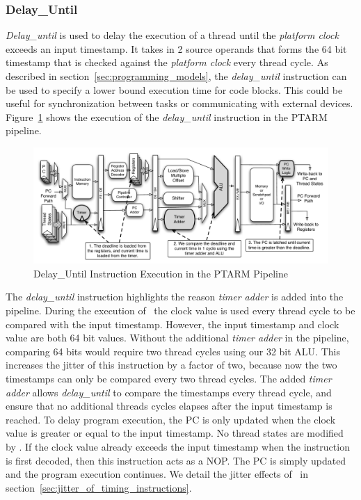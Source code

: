 \subsubsection{Delay\_Until}    
\emph{Delay\_until} is used to delay the execution of a thread until the \emph{platform clock} exceeds an input timestamp.
It takes in 2 source operands that forms the 64 bit timestamp that is checked against the \emph{platform clock} every thread cycle.
As described in section~\ref{sec:programming_models}, the \emph{delay\_until} instruction can be used to specify a lower bound execution time for code blocks.
This could be useful for synchronization between tasks or communicating with external devices.
Figure~\ref{fig:delay_until_pipeline_implementation} shows the execution of the \emph{delay\_until} instruction in the PTARM pipeline.       
\begin{figure}[h]
  \begin{center}
    \includegraphics[scale=.54]{figs/delay_until_pipeline_implementation}
  \end{center}
  \vspace{-3mm}
  \caption{Delay\_Until Instruction Execution in the PTARM Pipeline}
  \label{fig:delay_until_pipeline_implementation}
\end{figure}

The \emph{delay\_until} instruction highlights the reason \emph{timer adder} is added into the pipeline.
During the execution of \delayuntil\, the clock value is used every thread cycle to be compared with the input timestamp.
However, the input timestamp and clock value are both 64 bit values.
Without the additional \emph{timer adder} in the pipeline, comparing 64 bits would require two thread cycles using our 32 bit ALU. 
This increases the jitter of this instruction by a factor of two, because now the two timestamps can only be compared every two thread cycles. 
The added \emph{timer adder} allows \emph{delay\_until} to compare the timestamps every thread cycle, and ensure that no additional threads cycles elapses after the input timestamp is reached. 
To delay program execution, the PC is only updated when the clock value is greater or equal to the input timestamp.
No thread states are modified by \delayuntil.
If the clock value already exceeds the input timestamp when the instruction is first decoded, then this instruction acts as a NOP. 
The PC is simply updated and the program execution continues.
We detail the jitter effects of \delayuntil\ in section~\ref{sec:jitter_of_timing_instructions}.

